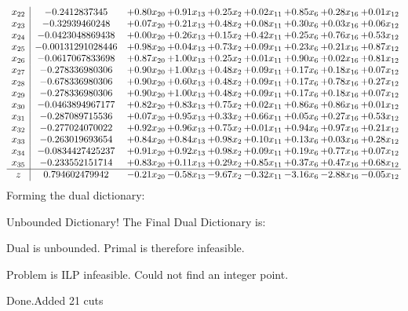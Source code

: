 \documentclass[8pt]{article}
\begin{document}
\[\begin{array}{c| c c@{\hskip 2pt} c@{\hskip 2pt} c@{\hskip 2pt} c@{\hskip 2pt} c@{\hskip 2pt} c@{\hskip 2pt} c@{\hskip 2pt} }
 x_{22}   &  -0.2412837345 & +  0.80 x_{20} & +  0.91 x_{13} & +  0.25 x_{2} & +  0.02 x_{11} & +  0.85 x_{6} & +  0.28 x_{16} & +  0.01 x_{12}\\
 x_{23}   &  -0.32939460248 & +  0.07 x_{20} & +  0.21 x_{13} & +  0.48 x_{2} & +  0.08 x_{11} & +  0.30 x_{6} & +  0.03 x_{16} & +  0.06 x_{12}\\
 x_{24}   &  -0.0423048869438 & +  0.00 x_{20} & +  0.26 x_{13} & +  0.15 x_{2} & +  0.42 x_{11} & +  0.25 x_{6} & +  0.76 x_{16} & +  0.53 x_{12}\\
 x_{25}   &  -0.00131291028446 & +  0.98 x_{20} & +  0.04 x_{13} & +  0.73 x_{2} & +  0.09 x_{11} & +  0.23 x_{6} & +  0.21 x_{16} & +  0.87 x_{12}\\
 x_{26}   &  -0.0617067833698 & +  0.87 x_{20} & +  1.00 x_{13} & +  0.25 x_{2} & +  0.01 x_{11} & +  0.90 x_{6} & +  0.02 x_{16} & +  0.81 x_{12}\\
 x_{27}   &  -0.278336980306 & +  0.90 x_{20} & +  1.00 x_{13} & +  0.48 x_{2} & +  0.09 x_{11} & +  0.17 x_{6} & +  0.18 x_{16} & +  0.07 x_{12}\\
 x_{28}   &  -0.678336980306 & +  0.90 x_{20} & +  0.60 x_{13} & +  0.48 x_{2} & +  0.09 x_{11} & +  0.17 x_{6} & +  0.78 x_{16} & +  0.27 x_{12}\\
 x_{29}   &  -0.278336980306 & +  0.90 x_{20} & +  1.00 x_{13} & +  0.48 x_{2} & +  0.09 x_{11} & +  0.17 x_{6} & +  0.18 x_{16} & +  0.07 x_{12}\\
 x_{30}   &  -0.0463894967177 & +  0.82 x_{20} & +  0.83 x_{13} & +  0.75 x_{2} & +  0.02 x_{11} & +  0.86 x_{6} & +  0.86 x_{16} & +  0.01 x_{12}\\
 x_{31}   &  -0.287089715536 & +  0.07 x_{20} & +  0.95 x_{13} & +  0.33 x_{2} & +  0.66 x_{11} & +  0.05 x_{6} & +  0.27 x_{16} & +  0.53 x_{12}\\
 x_{32}   &  -0.277024070022 & +  0.92 x_{20} & +  0.96 x_{13} & +  0.75 x_{2} & +  0.01 x_{11} & +  0.94 x_{6} & +  0.97 x_{16} & +  0.21 x_{12}\\
 x_{33}   &  -0.263019693654 & +  0.84 x_{20} & +  0.84 x_{13} & +  0.98 x_{2} & +  0.10 x_{11} & +  0.13 x_{6} & +  0.03 x_{16} & +  0.28 x_{12}\\
 x_{34}   &  -0.0834427425237 & +  0.91 x_{20} & +  0.92 x_{13} & +  0.98 x_{2} & +  0.09 x_{11} & +  0.19 x_{6} & +  0.77 x_{16} & +  0.07 x_{12}\\
 x_{35}   &  -0.233552151714 & +  0.83 x_{20} & +  0.11 x_{13} & +  0.29 x_{2} & +  0.85 x_{11} & +  0.37 x_{6} & +  0.47 x_{16} & +  0.68 x_{12}\\
\hline
z    &  0.794602479942 & -0.21 x_{20} & -0.58 x_{13} & -9.67 x_{2} & -0.32 x_{11} & -3.16 x_{6} & -2.88 x_{16} & -0.05 x_{12}\\
\end{array}\]
Forming the dual dictionary:

Unbounded Dictionary!
The Final Dual Dictionary is: 

 Dual is unbounded. Primal is therefore infeasible. 

Problem is ILP infeasible. Could not find an integer point. 

Done.Added 21 cuts 
\end{document}
